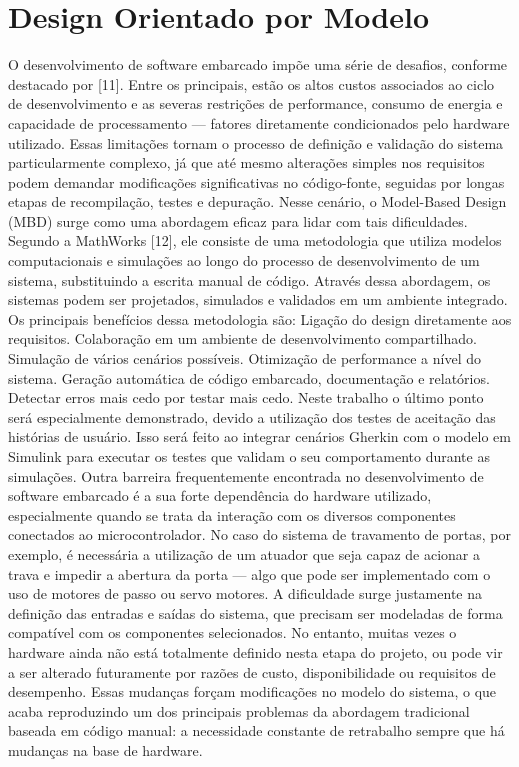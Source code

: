 \section{Design Orientado por Modelo}
O desenvolvimento de software embarcado impõe uma série de desafios, conforme destacado por [11]. Entre os principais, estão os altos custos associados ao ciclo de desenvolvimento e as severas restrições de performance, consumo de energia e capacidade de processamento — fatores diretamente condicionados pelo hardware utilizado. Essas limitações tornam o processo de definição e validação do sistema particularmente complexo, já que até mesmo alterações simples nos requisitos podem demandar modificações significativas no código-fonte, seguidas por longas etapas de recompilação, testes e depuração.
Nesse cenário, o Model-Based Design (MBD) surge como uma abordagem eficaz para lidar com tais dificuldades. Segundo a MathWorks [12], ele consiste de uma metodologia que utiliza modelos computacionais e simulações ao longo do processo de desenvolvimento de um sistema, substituindo a escrita manual de código. Através dessa abordagem, os sistemas podem ser projetados, simulados e validados em um ambiente integrado.
Os principais benefícios dessa metodologia são:
Ligação do design diretamente aos requisitos.
Colaboração em um ambiente de desenvolvimento compartilhado.
Simulação de vários cenários possíveis.
Otimização de performance a nível do sistema.
Geração automática de código embarcado, documentação e relatórios.
Detectar erros mais cedo por testar mais cedo.
Neste trabalho o último ponto será especialmente demonstrado, devido a utilização dos testes de aceitação das histórias de usuário. Isso será feito ao integrar cenários Gherkin com o modelo em Simulink para executar os testes que validam o seu comportamento durante as simulações.
Outra barreira frequentemente  encontrada no desenvolvimento de software embarcado é a sua forte dependência do hardware utilizado, especialmente quando se trata da interação com os diversos componentes conectados ao microcontrolador. No caso do sistema de travamento de portas, por exemplo, é necessária a utilização de um atuador que seja capaz de acionar a trava e impedir a abertura da porta — algo que pode ser implementado com o uso de motores de passo ou servo motores.
A dificuldade surge justamente na definição das entradas e saídas do sistema, que precisam ser modeladas de forma compatível com os componentes selecionados. No entanto, muitas vezes o hardware ainda não está totalmente definido nesta etapa do projeto, ou pode vir a ser alterado futuramente por razões de custo, disponibilidade ou requisitos de desempenho. Essas mudanças forçam modificações no modelo do sistema, o que acaba reproduzindo um dos principais problemas da abordagem tradicional baseada em código manual: a necessidade constante de retrabalho sempre que há mudanças na base de hardware.
